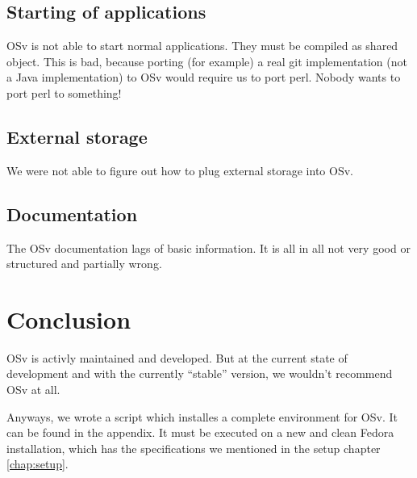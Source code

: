    \section{Starting of applications}

        OSv is not able to start normal applications. They must be compiled as
        shared object. This is bad, because porting (for example) a real git
        implementation (not a Java implementation) to OSv would require us to
        port perl. Nobody wants to port perl to something!

    \section{External storage}

        We were not able to figure out how to plug external storage into OSv.

    \section{Documentation}

        The OSv documentation lags of basic information. It is all in all not
        very good or structured and partially wrong.

\chapter{Conclusion}

    OSv is activly maintained and developed. But at the current state of
    development and with the currently ``stable'' version, we wouldn't recommend
    OSv at all.

    Anyways, we wrote a script which installes a complete environment for OSv.
    It can be found in the appendix. It must be executed on a new and clean
    Fedora installation, which has the specifications we mentioned in the setup
    chapter \ref{chap:setup}.
